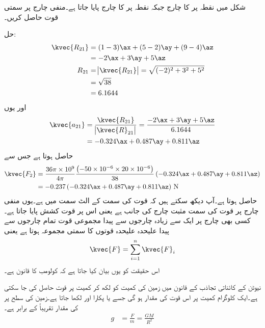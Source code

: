 شکل  میں نقطہ  پر  کا چارج  جبکہ نقطہ  پر  کا چارج  پایا جاتا ہے۔منفی چارج  پر سمتی قوت حاصل کریں۔

حل:
\begin{align*}
\kvec{R_{21}}&=(1-3) \ax+(5-2) \ay+(9-4)\az\\
&=-2 \ax+3 \ay+5 \az\\
R_{21}&=\abs{\kvec{R_{21}}}=\sqrt{(-2)^2+3^2+5^2}\\
&=\sqrt{38}\\
&=6.1644
\end{align*}
اور یوں
\begin{align*}
\kvec{a_{21}}&=\frac{{\kvec{R_{21}}}}{\abs{\kvec{R}_{21}}}=\frac{-2 {\ax}+3 {\ay}+5 \az}{6.1644}\\
&=-0.324 \ax+0.487 \ay+0.811\az
\end{align*}
حاصل ہوتا ہے جس سے
\begin{align*}
\kvec{F_2}&=\frac{36 \pi  \times 10^9}{4 \pi} \frac{\left (-50\times 10^{-6} \times 20 \times 10^{-6} \right )}{38} \left(-0.324 \ax+0.487 \ay+0.811\az\right)\\
&=-0.237  \left(-0.324 \ax+0.487 \ay+0.811\az \right) \, \si{\newton}
\end{align*}
حاصل ہوتا ہے۔آپ دیکھ سکتے ہیں کہ قوت کی سمت  کے الٹ سمت میں ہے۔یوں منفی چارج پر قوت کی سمت مثبت چارج کی جانب ہے یعنی اس پر قوت کشش پایا جاتا ہے۔
کسی بھی چارج پر ایک سے زیادہ چارجوں سے پیدا مجموعی قوت تمام چارجوں سے پیدا علیحدہ علیحدہ قوتوں کا سمتی مجموعہ ہوتا ہے یعنی
\begin{align}
\kvec{F}=\sum_{i=1}^n \kvec{F}_i
\end{align}
اس حقیقت کو یوں بیان کیا جاتا ہے کہ کولومب کا قانون  ہے۔ 

نیوٹن کے کائناتی تجاذب کے قانون میں زمین کی کمیت کو  لکھ کر کمیت  پر قوت  حاصل کی جا سکتی ہے۔ایک کلوگرام کمیت پر اس قوت کی مقدار  ہو گی جسے  یا  پکارا اور  لکھا جاتا ہے۔زمین کی سطح پر  کی مقدار تقریباً  کے برابر ہے۔
\begin{align}\label{مساوات_کولومب_زمین_کی_کشش}
g&=\frac{F}{m}=\frac{GM}{R^2}
\end{align}

